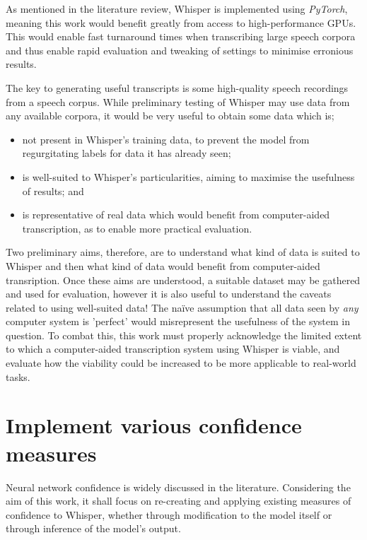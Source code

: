 As mentioned in the literature review, Whisper is implemented using \emph{PyTorch}, meaning this work would benefit greatly from access to high-performance GPUs.
This would enable fast turnaround times when transcribing large speech corpora and thus enable rapid evaluation and tweaking of settings to minimise erronious results.

The key to generating useful transcripts is some high-quality speech recordings from a speech corpus.
While preliminary testing of Whisper may use data from any available corpora, it would be very useful to obtain some data which is;

\begin{itemize}
        \item not present in Whisper's training data, to prevent the model from regurgitating labels for data it has already seen;
        \item is well-suited to Whisper's particularities, aiming to maximise the usefulness of results; and
        \item is representative of real data which would benefit from computer-aided transcription, as to enable more practical evaluation.
\end{itemize}

Two preliminary aims, therefore, are to understand what kind of data is suited to Whisper and then what kind of data would benefit from computer-aided transription.
Once these aims are understood, a suitable dataset may be gathered and used for evaluation, however it is also useful to understand the caveats related to using well-suited data!
The na\"{i}ve assumption that all data seen by \emph{any} computer system is 'perfect' would misrepresent the usefulness of the system in question.
To combat this, this work must properly acknowledge the limited extent to which a computer-aided transcription system using Whisper is viable, and evaluate how the viability could be increased to be more applicable to real-world tasks.

\section{Implement various confidence measures}

Neural network confidence is widely discussed in the literature.
Considering the aim of this work, it shall focus on re-creating and applying existing measures of confidence to Whisper, whether through modification to the model itself or through inference of the model's output.

